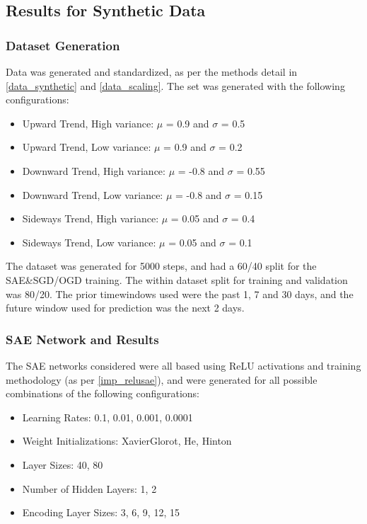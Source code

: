 \documentclass[a4paper,latin]{paper}
\begin{document}
\subsection{Results for Synthetic Data}

\subsubsection{Dataset Generation}

Data was generated and standardized, as per the methods detail in \ref{data_synthetic} and \ref{data_scaling}. The set was generated with the following configurations:
\begin{itemize}
	\item Upward Trend, High variance: $\mu$ = 0.9 and $\sigma$ = 0.5
	\item Upward Trend, Low variance:  $\mu$ = 0.9 and $\sigma$ = 0.2
	\item Downward Trend, High variance:  $\mu$ = -0.8 and $\sigma$ = 0.55
	\item Downward Trend, Low variance:  $\mu$ = -0.8 and $\sigma$ = 0.15
	\item Sideways Trend, High variance:  $\mu$ = 0.05 and $\sigma$ = 0.4
	\item Sideways Trend, Low variance:  $\mu$ = 0.05 and $\sigma$ = 0.1			
\end{itemize}

The dataset was generated for 5000 steps, and had a 60/40 split for the SAE\&SGD/OGD training. The within dataset split for training and validation was 80/20. The prior timewindows used were the past 1, 7 and 30 days, and the future window used for prediction was the next 2 days.

\subsubsection{SAE Network and Results}

The SAE networks considered were all based using ReLU activations and training methodology (as per \ref{imp_relusae}), and were generated for all possible combinations of the following configurations:

\begin{itemize}
	\item Learning Rates: 0.1, 0.01, 0.001, 0.0001	
	\item Weight Initializations: XavierGlorot, He, Hinton
	\item Layer Sizes: 40, 80
	\item Number of Hidden Layers: 1, 2
	\item Encoding Layer Sizes: 3, 6, 9, 12, 15
\end{itemize}
\end{document}
